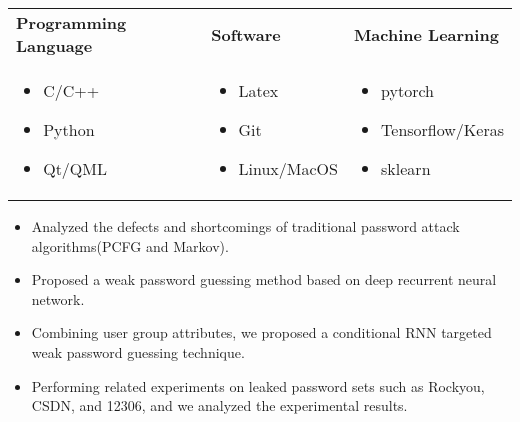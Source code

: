﻿\documentclass{resume_en}
\author{Lu\ \ Chu}
\begin{document}
\maketitle

\TechnicalSkills
\begin{table}[H]
	\centering
	\begin{tabularx}{\textwidth}{X X X}
         \textbf{Programming Language} & \textbf{Software}  & \textbf{Machine Learning}\\
		\begin{itemize}
			\item C/C++
			\item Python
			\item Qt/QML
		\end{itemize} &
		\begin{itemize}
			\item Latex
			\item Git
			\item Linux/MacOS
		\end{itemize} &
        \begin{itemize}
            \item pytorch
            \item Tensorflow/Keras
            \item sklearn
        \end{itemize}
	\end{tabularx}
\end{table}
\vspace{-4em} %
\Education



\TechnicalProjects
\begin{itemize}
	\item Analyzed the defects and shortcomings of traditional password attack algorithms(PCFG and Markov).
	\item Proposed a weak password guessing method based on deep recurrent neural network.
    \item Combining user group attributes, we proposed a conditional RNN targeted weak password guessing technique.
    \item Performing related experiments on leaked password sets such as Rockyou, CSDN, and 12306, and we analyzed the experimental results.
\end{itemize}
\end{document}
